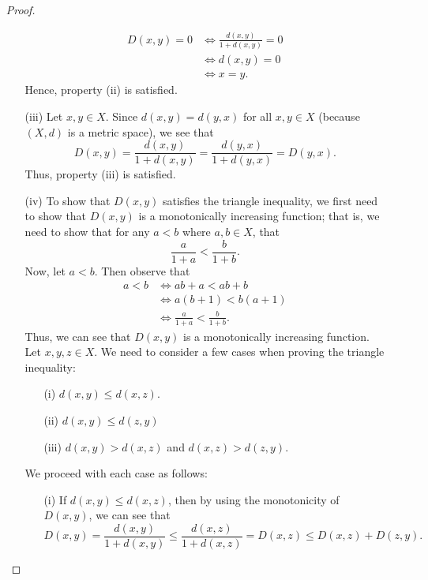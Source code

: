 \documentclass{article}
\begin{document}
\begin{enumerate}
\begin{proof}
\begin{enumerate}
            \begin{align*}
                D(x,y) = 0 &\Longleftrightarrow \frac{ d(x,y) }{ 1 + d(x,y)  } = 0 \\
                           &\Longleftrightarrow d(x,y) = 0 \\
                           &\Longleftrightarrow x = y.
            \end{align*}
            Hence, property (ii) is satisfied.
        \item[(iii)] Let \( x,y \in X  \). Since \( d(x,y) = d(y,x) \) for all \( x,y \in X  \) (because \( (X,d) \) is a metric space), we see that  
            \[ D(x,y) = \frac{ d(x,y) }{ 1 + d(x,y) } = \frac{ d(y,x) }{ 1 + d(y,x) }  = D(y,x).  \]
            Thus, property (iii) is satisfied.
        \item[(iv)] To show that \( D(x,y) \) satisfies the triangle inequality, we first need to show that \( D(x,y) \) is a monotonically increasing function; that is, we need to show that for any \( a < b  \) where \( a,b \in X  \), that 
            \[  \frac{ a  }{ 1 + a  }  < \frac{ b  }{  1 + b }. \]
            Now, let \( a < b  \). Then observe that
            \begin{align*}
                a <  b  &\Longleftrightarrow ab + a < ab +  b  \\
                        &\Longleftrightarrow a (b + 1) < b (a + 1) \\
                        &\Longleftrightarrow \frac{ a  }{ 1 + a  }  < \frac{ b }{  1 + b } .
            \end{align*}
            Thus, we can see that \( D(x,y) \) is a monotonically increasing function. Let \( x,y,z \in X  \). We need to consider a few cases when proving the triangle inequality:
            \begin{enumerate}
                \item[(i)] \( d(x,y) \leq d(x,z) \).
                \item[(ii)] \( d(x,y) \leq d(z,y) \)
                \item[(iii)] \( d(x,y) > d(x,z) \) and \( d(x,z) > d(z,y) \).
            \end{enumerate}
            We proceed with each case as follows:
            \begin{enumerate}
                \item[(i)] If \( d(x,y) \leq d(x,z) \), then by using the monotonicity of \( D(x,y) \), we can see that 
                    \[  D(x,y) = \frac{ d(x,y) }{ 1 + d(x,y) } \leq \frac{ d(x,z) }{ 1 + d(x,z) } = D(x,z) \leq D(x,z) + D(z,y). \]

\end{enumerate}
\end{enumerate}
\end{proof}
\end{enumerate}
\end{document}
